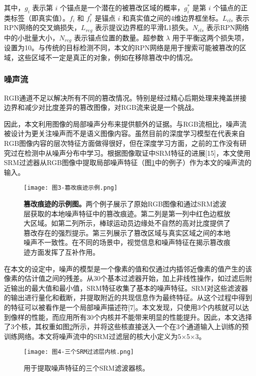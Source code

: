 \documentclass[a4paper]{article}
\begin{document}
其中，$g_{i}$ 表示第 $i$ 个锚点是一个潜在的被篡改区域的概率，$g_{i}^{*}$ 是第 $i$ 个锚点的正类标签（即真实值）。$f_{i}$ 和 $f_{i}^{*}$ 是锚点 $i$ 和真实值之间的4维边界框坐标。$L_{cls}$ 表示RPN网络的交叉熵损失，$L_{reg}$ 表示提议边界框的平滑L1损失。$N_{cls}$ 表示RPN网络中的小批量大小，$N_{reg}$ 表示锚点位置的数量。超参数 $\lambda$ 用于平衡这两个损失项，设置为10。与传统的目标检测不同，本文的RPN网络是用于搜索可能被篡改的区域，这些区域不一定是真正的对象，例如在移除篡改中的情况。

\subsubsection{噪声流}
RGB通道不足以解决所有不同的篡改情况。特别是经过精心后期处理来掩盖拼接边界和减少对比度差异的篡改图像，对RGB流来说是一个挑战。

因此，本文利用图像的局部噪声分布来提供额外的证据。与RGB流相比，噪声流被设计为更关注噪声而不是语义图像内容。虽然目前的深度学习模型在代表来自RGB图像内容的层次特征方面做得很好，但在深度学习方面，之前的工作没有研究过在检测中从噪声分布中学习。根据图像取证中SRM特征的进展[15]，本文使用SRM过滤器从RGB图像中提取局部噪声特征（图\ref{fig:篡改痕迹示例}中的例子）作为本文的噪声流的输入。

\begin{figure}[H]
\centering
\texttt{[image: 图3-篡改痕迹示例.png]}
\caption{\label{fig:篡改痕迹示例}\textbf{篡改痕迹的示例图。}两个例子展示了原始RGB图像和通过SRM滤波层获取的本地噪声特征中的篡改痕迹。第二列是第一列中红色边框放大区域。如第二列所示，棒球运动员边缘处不自然的高对比度提供了篡改存在的强烈提示。第三列展示了篡改区域与真实区域之间的本地噪声不一致性。在不同的场景中，视觉信息和噪声特征在揭示篡改痕迹方面发挥了互补作用。}
\end{figure}

在本文的设定中，噪声的模型是一个像素的值和仅通过内插邻近像素的值产生的该像素的估计值之间的残差。从30个基本过滤器开始，加上非线性操作，如过滤后附近输出的最大值和最小值，SRM特征收集了基本的噪声特征。SRM对这些滤波器的输出进行量化和截断，并提取附近的共现信息作为最终特征。从这个过程中得到的特征可以被看作是一个局部噪声描述符[7]。本文发现，只使用3个内核就可以达到像样的性能，而应用所有30个内核并不能带来明显的性能提升。因此，本文选择了3个核，其权重如图\ref{fig:三个SRM过滤层内核}所示，并将这些核直接送入一个在3个通道输入上训练的预训练网络。本文将噪声流中的SRM过滤层的核大小定义为5×5×3。

\begin{figure}[H]
\centering
\texttt{[image: 图4-三个SRM过滤层内核.png]}
\caption{\label{fig:三个SRM过滤层内核}用于提取噪声特征的三个SRM滤波器核。}
\end{figure}
\end{document}
